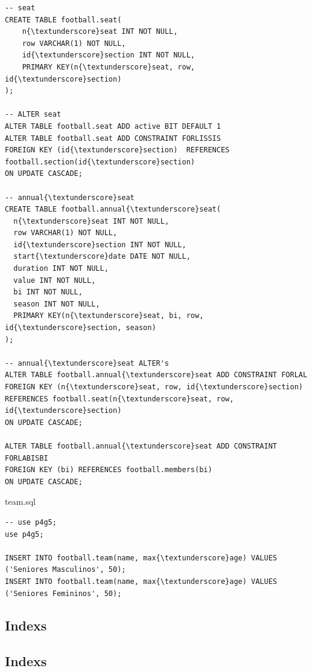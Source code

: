 \documentclass[pdftex,12pt,a4paper]{report}
\begin{document}
\begin{lstlisting}
-- seat
CREATE TABLE football.seat(
    n{\textunderscore}seat INT NOT NULL,
    row VARCHAR(1) NOT NULL,
    id{\textunderscore}section INT NOT NULL,
    PRIMARY KEY(n{\textunderscore}seat, row, id{\textunderscore}section)
);

-- ALTER seat
ALTER TABLE football.seat ADD active BIT DEFAULT 1
ALTER TABLE football.seat ADD CONSTRAINT FORLISSIS
FOREIGN KEY (id{\textunderscore}section)  REFERENCES football.section(id{\textunderscore}section)
ON UPDATE CASCADE;

-- annual{\textunderscore}seat
CREATE TABLE football.annual{\textunderscore}seat(
  n{\textunderscore}seat INT NOT NULL,
  row VARCHAR(1) NOT NULL,
  id{\textunderscore}section INT NOT NULL,
  start{\textunderscore}date DATE NOT NULL,
  duration INT NOT NULL,
  value INT NOT NULL,
  bi INT NOT NULL,
  season INT NOT NULL,
  PRIMARY KEY(n{\textunderscore}seat, bi, row, id{\textunderscore}section, season)
);

-- annual{\textunderscore}seat ALTER's
ALTER TABLE football.annual{\textunderscore}seat ADD CONSTRAINT FORLAL
FOREIGN KEY (n{\textunderscore}seat, row, id{\textunderscore}section) REFERENCES football.seat(n{\textunderscore}seat, row, id{\textunderscore}section)
ON UPDATE CASCADE;

ALTER TABLE football.annual{\textunderscore}seat ADD CONSTRAINT FORLABISBI
FOREIGN KEY (bi) REFERENCES football.members(bi)
ON UPDATE CASCADE;

\end{lstlisting}

team.sql
\begin{lstlisting} 
-- use p4g5;
use p4g5;

INSERT INTO football.team(name, max{\textunderscore}age) VALUES ('Seniores Masculinos', 50);
INSERT INTO football.team(name, max{\textunderscore}age) VALUES ('Seniores Femininos', 50);

\end{lstlisting}




\newpage
\subsection*{Indexs}
\newpage
\subsection*{Indexs}
\end{document}
